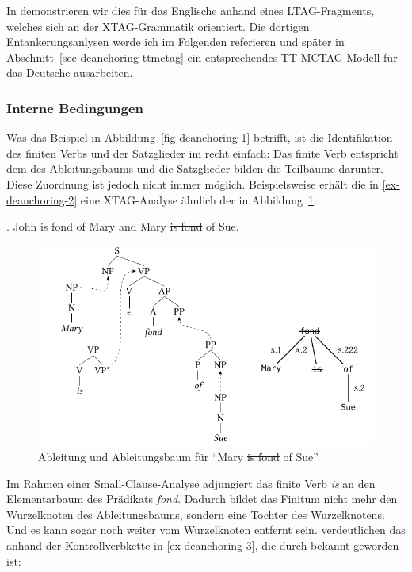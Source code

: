 In \cite{Lichte:Kallmeyer:10} demonstrieren wir dies für das Englische anhand eines LTAG-Fragments, welches sich an der XTAG-Grammatik \citep{xtag:01} orientiert. Die dortigen Entankerungsanlysen werde ich im Folgenden referieren und später in Abschnitt~\ref{sec-deanchoring-ttmctag} ein entsprechendes TT-MCTAG-Modell für das Deutsche ausarbeiten. 

\subsubsection*{Interne Bedingungen} 

Was das Beispiel in Abbildung~\ref{fig-deanchoring-1} betrifft, ist die Identifikation des finiten Verbs und der Satzglieder im  recht einfach: Das finite Verb entspricht dem  des Ableitungsbaums und die Satzglieder bilden die Teilbäume darunter. Diese Zuordnung ist jedoch nicht immer möglich. Beispielsweise erhält die  in \ref{ex-deanchoring-2} eine XTAG-Analyse ähnlich der in Abbildung~\ref{fig-deanchoring-3}:    
  
\ex. \label{ex-deanchoring-2} John is fond of Mary and Mary \sout{is fond} of  Sue.
\hfill \citep[(4a)]{Lichte:Kallmeyer:10}

\begin{figure}[t]
\centering
\includegraphics{graphics/abb816.pdf}
\caption{\label{fig-deanchoring-3}Ableitung und Ableitungsbaum für "`Mary \sout{is fond} of Sue"' \citep[Figure~4]{Lichte:Kallmeyer:10}}
\end{figure} 
Im Rahmen einer Small-Clause-Analyse adjungiert das finite Verb {\it is} an den Elementarbaum des Prädikats {\it fond}. Dadurch bildet das Finitum nicht mehr den Wurzelknoten des Ableitungsbaums, sondern eine Tochter des Wurzelknotens. Und es kann sogar noch weiter vom Wurzelknoten entfernt sein. \cite{Lichte:Kallmeyer:10} verdeutlichen das anhand der Kontroll\-verb\-kette in \ref{ex-deanchoring-3}, die durch \cite{Ross:70} bekannt geworden ist:  

